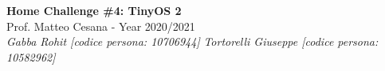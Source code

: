 \documentclass{article}
\begin{document}
\begin{titlepage}
   \begin{center}
      \Huge\textbf{Home Challenge \#4: TinyOS 2}\\
      \vspace{5mm} %
      \Large Prof. Matteo Cesana - Year 2020/2021\\
      \vspace{5mm} %
      \large\textit{Gabba Rohit [codice persona: 10706944]}
      \linebreak
      \large\textit{Tortorelli Giuseppe [codice persona: 10582962]}
      \linebreak
      \linebreak
      \linebreak
      \linebreak
   \end{center}
\end{titlepage}

\pagebreak
\end{document}
